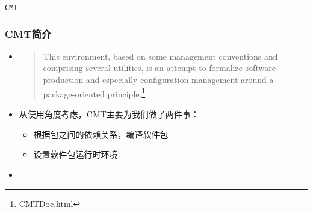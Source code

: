 
\begin{frame}
    \begin{center}
        \LARGE \tt{CMT}
    \end{center}
\end{frame}

\begin{frame}
    \frametitle{CMT简介}
    \begin{itemize}    
        \item 
            \begin{quote}
                This environment, based on some management conventions and
                comprising several utilities, is an attempt to formalize
                software production and especially configuration management
                around a package-oriented principle.\footnote{CMTDoc.html}
            \end{quote} 
        \item 从使用角度考虑，CMT主要为我们做了两件事：
            \begin{itemize}
                \item 根据包之间的依赖关系，编译软件包
                \item 设置软件包运行时环境
            \end{itemize}
        \item 
    \end{itemize}
\end{frame}


